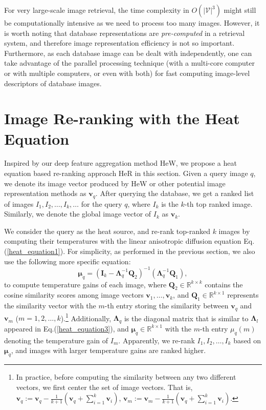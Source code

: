\documentclass[journal]{IEEEtran}
\begin{document}
For very large-scale image retrieval, the time complexity in  $O(|\mathcal {V}|^3)$ might still be computationally intensive as we need to process too many images. However, it is worth noting that database representations are \emph{pre-computed} in a retrieval system, and therefore image representation efficiency is not so important.
Furthermore, as each database image can be dealt with independently, one can take advantage of the parallel processing technique (with a multi-core computer or with multiple computers, or even with both) for fast computing image-level descriptors of database images.

\section{Image Re-ranking with the Heat Equation}\label{sec:image_re-ranking}
Inspired by our deep feature aggregation method HeW, we propose a heat equation based re-ranking approach HeR in this section.
Given a query image $q$, we denote its image vector produced by HeW or other potential image representation methods as $\boldsymbol{v}_q$. After querying the database, we get a ranked list of images $I_1, I_2, \ldots, I_k, \ldots$ for the query $q$, where $I_k$ is the $k$-th top ranked image. Similarly, we denote the global image vector of $I_k$ as $\boldsymbol{v}_k$.

We consider the query as the heat source, and re-rank top-ranked $k$ images by computing their temperatures with the linear anisotropic diffusion equation Eq.(\ref{heat_equation1}).
For simplicity, as performed in the previous section, we also use the following more specific equation:
\begin{equation}\label{eq:re-ranking}
\boldsymbol{\mu}_q = (\boldsymbol{I}_{k}-\boldsymbol{\Lambda}^{-1}_{q}\boldsymbol{Q}_2)^{-1}(\boldsymbol{\Lambda}^{-1}_{q}\boldsymbol{Q}_1),
\end{equation}
to compute temperature gains of each image, where $\boldsymbol{Q}_2 \in \mathbb{R}^{k\times k}$ contains the cosine similarity scores among image vectors $\boldsymbol{v}_1, \ldots, \boldsymbol{v}_k$,
and $\boldsymbol{Q}_1 \in \mathbb{R}^{k\times 1}$ represents the similarity vector with the $m$-th entry storing the similarity between $\boldsymbol{v}_q$ and $\boldsymbol{v}_m$ ($m=1, 2, \ldots, k$).\footnote{In practice, before computing the similarity between any two different vectors, we first center the set of image vectors. That is, $\boldsymbol{v}_q := \boldsymbol{v}_q- \frac{1}{k+1}(\boldsymbol{v}_q+\sum_{i=1}^{k}\boldsymbol{v}_i)$, $\boldsymbol{v}_m := \boldsymbol{v}_m- \frac{1}{k+1}(\boldsymbol{v}_q+\sum_{i=1}^{k}\boldsymbol{v}_i)$. }
Additionally,  $\boldsymbol{\Lambda}_{q}$ is the diagonal matrix that is similar to $\boldsymbol{\Lambda}_{l}$ appeared in Eq.(\ref{heat_equation3}), and $\boldsymbol{\mu}_q \in \mathbb{R}^{k\times 1}$ with the $m$-th entry $\mu_q(m)$  denoting the temperature gain of $I_m$.
Apparently, we re-rank $I_1, I_2, \ldots, I_k$ based on $\boldsymbol{\mu}_q$, and images with larger temperature gains are ranked higher.
\end{document}

